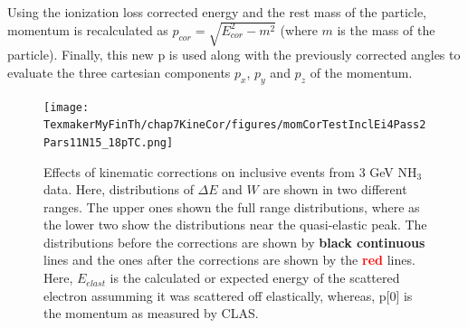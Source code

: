 
    

Using the ionization loss corrected energy and the rest mass of the particle, momentum is recalculated as $p_{cor} = \sqrt{E^2_{cor}-m^2}$ 
(where $m$ is the mass of the particle). Finally, this new p is used along with the previously corrected angles to evaluate the three 
cartesian components $p_x$, $p_y$ and $p_z$ of the momentum.




\begin{figure}[htpb] %
\centering
 \leavevmode \texttt{[image: TexmakerMyFinTh/chap7KineCor/figures/momCorTestInclEi4Pass2Pars11N15\_18pTC.png]} 
\caption[Effects of corrections on inclusive events from 3 GeV NH$_3$ data]{Effects of kinematic corrections on inclusive events 
from 3 GeV NH$_3$ data. Here, distributions of $\Delta E$ and $W$ are shown in two different ranges. The upper ones shown the full 
range distributions, where as the lower two show the distributions near the quasi-elastic peak. The distributions before the 
corrections are shown by {\bf black continuous} lines and the ones after the corrections are shown by the \textcolor{red}{{\bf red}}%
lines. Here, $E_{elast}$ is the calculated or expected energy of the scattered electron assumming it was scattered off
elastically, whereas, p[0] is the momentum as measured by CLAS.}
\label{fig:epElastic}
\end{figure}

